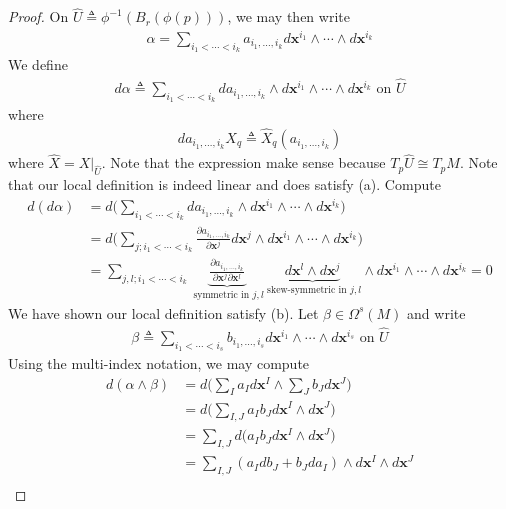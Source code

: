 \documentclass{report}
\begin{document}
\begin{proof}
On $\widehat{U}\triangleq \phi^{-1}(B_{r}(\phi (p)))$, we may then write 
\begin{align*}
\alpha  = \sum_{i_1 < \cdots <i_k} a_{i_1,\dots ,i_k} d\textbf{x}^{i_1} \wedge  \cdots \wedge  d\textbf{x}^{i_k}  
\end{align*}
We define 
\begin{align*}
d\alpha \triangleq  \sum_{i_1< \cdots < i_k}da_{i_1,\dots ,i_k} \wedge   d\textbf{x}^{i_1}\wedge  \cdots \wedge  d\textbf{x}^{i_k}  \text{ on }\widehat{U}
\end{align*}
where 
\begin{align*}
da_{i_1,\dots ,i_k} X_q\triangleq \widehat{X}_q (a_{i_1,\dots ,i_k})
\end{align*}
where  $\widehat{X}=X |_{\widehat{U}}$. Note that the expression make sense because $T_p \widehat{U}\cong T_pM$. Note that our local definition is indeed linear and does satisfy (a). Compute 
\begin{align*}
d(d\alpha )&= d\Big(\sum_{i_1< \cdots < i_k}da_{i_1,\dots ,i_k} \wedge   d\textbf{x}^{i_1}\wedge  \cdots \wedge  d\textbf{x}^{i_k}   \Big)\\
&=d\Big(\sum_{j;i_1<\cdots <i_k} \frac{\partial a_{i_1,\dots ,i_k}}{\partial \textbf{x}^j}d\textbf{x}^j \wedge  d\textbf{x}^{i_1}\wedge \cdots \wedge  d\textbf{x}^{i_k}    \Big)\\
&=\sum_{j,l;i_1<\cdots <i_k} \underbrace{\frac{\partial a_{i_1,\dots ,i_k}}{\partial \textbf{x}^j \partial \textbf{x}^l}}_{\text{ symmetric in }j,l}\underbrace{d\textbf{x}^l \wedge   d\textbf{x}^j}_{\text{ skew-symmetric in }j,l} \wedge  d\textbf{x}^{i_1}\wedge \cdots \wedge  d\textbf{x}^{i_k} =0 
\end{align*}
We have shown our local definition satisfy (b). Let $\beta  \in \Omega^{s}(M)$ and write 
\begin{align*}
\beta  \triangleq \sum_{i_1 <\cdots <i_s}b_{i_1,\dots ,i_{s}} d\textbf{x}^{i_1} \wedge  \cdots  \wedge  d\textbf{x}^{i_{s}} \text{ on }\widehat{U}
\end{align*}
Using the multi-index notation, we may compute 
\begin{align*}
d(\alpha \wedge  \beta  )&= d\Big(\sum_I a_I d\textbf{x}^{I}\wedge \sum_J b_Jd\textbf{x}^{J} \Big) \\
&= d\Big( \sum_{I,J} a_I b_J d\textbf{x}^I \wedge d\textbf{x}^J  \Big) \\
&=\sum_{I,J} d\big( a_Ib_J d\textbf{x}^I \wedge  d\textbf{x}^J  \big) \\
&=\sum_{I,J} (a_I db_J+b_Jda_I)\wedge   d\textbf{x}^I \wedge  d\textbf{x}^J  \\

\end{align*}
\end{proof}
\end{document}
